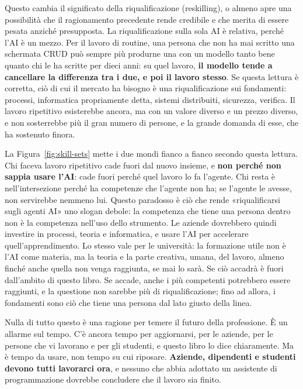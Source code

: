 \documentclass[10pt,oneside,openany]{book}
\begin{document}
Questo cambia il significato della riqualificazione (reskilling), o almeno apre una possibilità che il ragionamento precedente rende credibile e che merita di essere pesata anziché presupposta. La riqualificazione sulla sola AI è relativa, perché l'AI è un mezzo. Per il lavoro di routine, una persona che non ha mai scritto una schermata CRUD può sempre più produrne una con un modello tanto bene quanto chi le ha scritte per dieci anni: su quel lavoro, \textbf{il modello tende a cancellare la differenza tra i due, e poi il lavoro stesso}. Se questa lettura è corretta, ciò di cui il mercato ha bisogno è una riqualificazione sui fondamenti: processi, informatica propriamente detta, sistemi distribuiti, sicurezza, verifica. Il lavoro ripetitivo esisterebbe ancora, ma con un valore diverso e un prezzo diverso, e non sosterrebbe più il gran numero di persone, e la grande domanda di esse, che ha sostenuto finora.

La Figura~\ref{fig:skill-sets} mette i due mondi fianco a fianco secondo questa lettura. Chi faceva lavoro ripetitivo cade fuori dal nuovo insieme, e \textbf{non perché non sappia usare l'AI}: cade fuori perché quel lavoro lo fa l'agente. Chi resta è nell'intersezione perché ha competenze che l'agente non ha; se l'agente le avesse, non servirebbe nemmeno lui. Questo paradosso è ciò che rende «riqualificarsi sugli agenti AI» uno slogan debole: la competenza che tiene una persona dentro non è la competenza nell'uso dello strumento. Le aziende dovrebbero quindi investire in processi, teoria e informatica, e usare l'AI per accelerare quell'apprendimento. Lo stesso vale per le università: la formazione utile non è l'AI come materia, ma la teoria e la parte creativa, umana, del lavoro, almeno finché anche quella non venga raggiunta, se mai lo sarà. Se ciò accadrà è fuori dall'ambito di questo libro. Se accade, anche i più competenti potrebbero essere raggiunti, e la questione non sarebbe più di riqualificazione; fino ad allora, i fondamenti sono ciò che tiene una persona dal lato giusto della linea.

Nulla di tutto questo è una ragione per temere il futuro della professione. È un allarme sul tempo. C'è ancora tempo per aggiornarsi, per le aziende, per le persone che vi lavorano e per gli studenti, e questo libro lo dice chiaramente. Ma è tempo da usare, non tempo su cui riposare. \textbf{Aziende, dipendenti e studenti devono tutti lavorarci ora}, e nessuno che abbia adottato un assistente di programmazione dovrebbe concludere che il lavoro sia finito.
\end{document}
